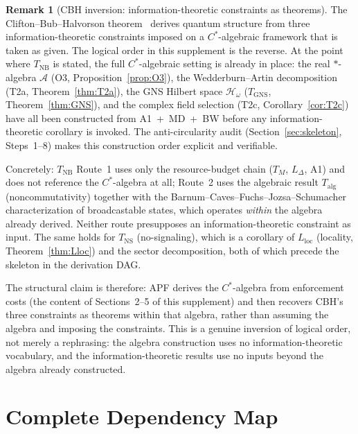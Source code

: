 \documentclass[11pt,a4paper]{article}
\theoremstyle{definition}
\newtheorem{remark}[theorem]{Remark}
\begin{document}
\begin{remark}[CBH inversion: information-theoretic constraints as theorems]\label{rem:CBH_inversion}
The Clifton--Bub--Halvorson theorem~\cite{CBH2003} derives quantum structure from three information-theoretic constraints imposed on a $C^*$-algebraic framework that is taken as given.  The logical order in this supplement is the reverse.  At the point where $T_{\mathrm{NB}}$ is stated, the full $C^*$-algebraic setting is already in place: the real $*$-algebra $\mathcal{A}$ (O3, Proposition~\ref{prop:O3}), the Wedderburn--Artin decomposition (T2a, Theorem~\ref{thm:T2a}), the GNS Hilbert space $\mathcal{H}_\omega$ ($T_{\mathrm{GNS}}$, Theorem~\ref{thm:GNS}), and the complex field selection (T2c, Corollary~\ref{cor:T2c}) have all been constructed from A1~+~MD~+~BW before any information-theoretic corollary is invoked.  The anti-circularity audit (Section~\ref{sec:skeleton}, Steps~1--8) makes this construction order explicit and verifiable.

Concretely: $T_{\mathrm{NB}}$ Route~1 uses only the resource-budget chain ($T_M$, $L_\Delta$, A1) and does not reference the $C^*$-algebra at all; Route~2 uses the algebraic result $T_{\mathrm{alg}}$ (noncommutativity) together with the Barnum--Caves--Fuchs--Jozsa--Schumacher characterization of broadcastable states, which operates \emph{within} the algebra already derived.  Neither route presupposes an information-theoretic constraint as input.  The same holds for $T_{\mathrm{NS}}$ (no-signaling), which is a corollary of $L_{\mathrm{loc}}$ (locality, Theorem~\ref{thm:Lloc}) and the sector decomposition, both of which precede the skeleton in the derivation DAG.

The structural claim is therefore: APF derives the $C^*$-algebra from enforcement costs (the content of Sections~2--5 of this supplement) and then recovers CBH's three constraints as theorems within that algebra, rather than assuming the algebra and imposing the constraints.  This is a genuine inversion of logical order, not merely a rephrasing: the algebra construction uses no information-theoretic vocabulary, and the information-theoretic results use no inputs beyond the algebra already constructed.
\end{remark}

\section{Complete Dependency Map}
\label{sec:dependency}
\end{document}
